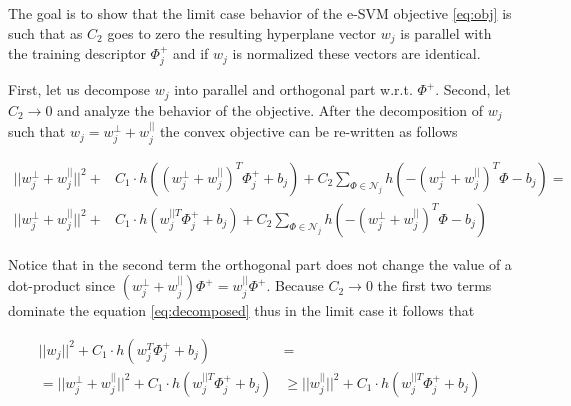 \documentclass[table]{article} %
\begin{document}
        The goal is to show that the limit case behavior of the e-SVM objective \eqref{eq:obj} is such that as $C_2$ goes to zero the resulting hyperplane vector $w_j$ is parallel with the training descriptor $\Phi_j^+$ and if $w_j$ is normalized these vectors are identical.

		First, let us decompose $w_j$ into parallel and orthogonal part w.r.t. $\Phi^+$. Second, let $C_2\rightarrow 0$ and analyze the behavior of the objective. After the decomposition of $w_j$ such that $w_j=w_j^{\perp}+w_j^{||}$ the convex objective can be re-written as follows

	  	\begin{align}
	  		\nonumber
	        ||w_j^{\perp}+w_j^{||}||^{2} +&
	        C_1 \cdot h
	        \left(
	        	(w_j^{\perp}+w_j^{||})^T\Phi^+_j+b_j
	        \right)+
	        C_2\sum_{\Phi\in \mathcal N_j} h
	        \left(
	        	-(w_j^{\perp}+w_j^{||})^T\Phi-b_j
	        \right)
	        = \\ 
	        ||w_j^{\perp}+w_j^{||}||^{2} +&
	        C_1 \cdot h
	        \left(
	        	w_j^{||T}\Phi^+_j+b_j
	        \right)+
	        C_2\sum_{\Phi\in \mathcal N_j} h
	        \left(
	        	-(w_j^{\perp}+w_j^{||})^T\Phi-b_j
	        \right)	
	       	\label{eq:decomposed} 
	  	\end{align}	

	  	Notice that in the second term the orthogonal part does not change the value of a dot-product since $(w_j^{\perp}+w_j^{||})\Phi^+=w_j^{||}\Phi^+$. Because $C_2 \rightarrow 0$ the first two terms dominate the equation \eqref{eq:decomposed} thus in the limit case it follows that

		  	\begin{align}
                \nonumber
		  		||w_j||^2 +C_1 \cdot 
		        h
		        \left(
		        	w_j^T\Phi^+_j+b_j
		        \right)&=\\
		        =||w_j^{\perp}+w_j^{||}||^{2} +
		        C_1 \cdot h
		        \left(
		        	w_j^{||T}\Phi^+_j+b_j
		        \right)
		        &\geq
		        ||w_j^{||}||^2 +C_1 \cdot 
		        h
		        \left(
		        	w_j^{||T}\Phi^+_j+b_j
		        \right)
		       	\label{eq:bound} 
		  	\end{align}
\end{document}
